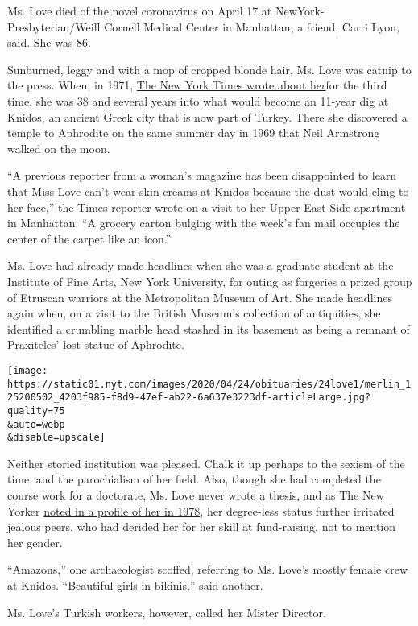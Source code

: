 Ms. Love died of the novel coronavirus on April 17 at
NewYork-Presbyterian/Weill Cornell Medical Center in Manhattan, a
friend, Carri Lyon, said. She was 86.

Sunburned, leggy and with a mop of cropped blonde hair, Ms. Love was
catnip to the press. When, in 1971,
\href{https://www.nytimes.com/1971/03/07/archives/an-archeological-find-named-iris-love-archeological-find.html}{The
New York Times wrote about her}for the third time, she was 38 and
several years into what would become an 11-year dig at Knidos, an
ancient Greek city that is now part of Turkey. There she discovered a
temple to Aphrodite on the same summer day in 1969 that Neil Armstrong
walked on the moon.

``A previous reporter from a woman's magazine has been disappointed to
learn that Miss Love can't wear skin creams at Knidos because the dust
would cling to her face,'' the Times reporter wrote on a visit to her
Upper East Side apartment in Manhattan. ``A grocery carton bulging with
the week's fan mail occupies the center of the carpet like an icon.''

Ms. Love had already made headlines when she was a graduate student at
the Institute of Fine Arts, New York University, for outing as forgeries
a prized group of Etruscan warriors at the Metropolitan Museum of Art.
She made headlines again when, on a visit to the British Museum's
collection of antiquities, she identified a crumbling marble head
stashed in its basement as being a remnant of Praxiteles' lost statue of
Aphrodite.

\texttt{[image: https://static01.nyt.com/images/2020/04/24/obituaries/24love1/merlin\_125200502\_4203f985-f8d9-47ef-ab22-6a637e3223df-articleLarge.jpg?quality=75\\\&auto=webp\\\&disable=upscale]}

Neither storied institution was pleased. Chalk it up perhaps to the
sexism of the time, and the parochialism of her field. Also, though she
had completed the course work for a doctorate, Ms. Love never wrote a
thesis, and as The New Yorker
\href{https://www.newyorker.com/magazine/1978/07/17/the-dig-at-cnidus}{noted
in a profile of her in 1978}, her degree-less status further irritated
jealous peers, who had derided her for her skill at fund-raising, not to
mention her gender.

``Amazons,'' one archaeologist scoffed, referring to Ms. Love's mostly
female crew at Knidos. ``Beautiful girls in bikinis,'' said another.

Ms. Love's Turkish workers, however, called her Mister Director.

